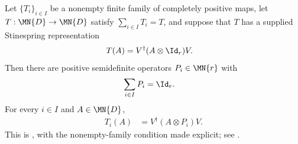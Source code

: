 \begin{theorem}
    \label{thm:cp_radon_nikodym_of_stinespring}
    \leanok
    Let $\{T_i\}_{i\in I}$ be a nonempty finite family of completely positive
    maps, let $T:\MN{D}\to\MN{D}$ satisfy $\sum_{i\in I}T_i=T$, and
    suppose that $T$ has a supplied Stinespring representation
    \begin{align}
        T(A)
        &=V^\dagger(A\otimes\Id_r)V.
        \label{eq:representations_radon_dilation}
    \end{align}
    Then there are positive semidefinite operators $P_i\in\MN{r}$ with
    \begin{align}
        \sum_{i\in I}P_i
        &=\Id_r.
        \label{eq:representations_radon_resolution}
    \end{align}
    For every $i\in I$ and $A\in\MN{D}$,
    \begin{align}
        T_i(A)
        &=V^\dagger(A\otimes P_i)V.
        \label{eq:representations_radon_components}
    \end{align}
    This is \cite[Theorem~2.4]{Wolf2012Quantum}, with the nonempty-family condition
    made explicit; see
    .
\end{theorem}

